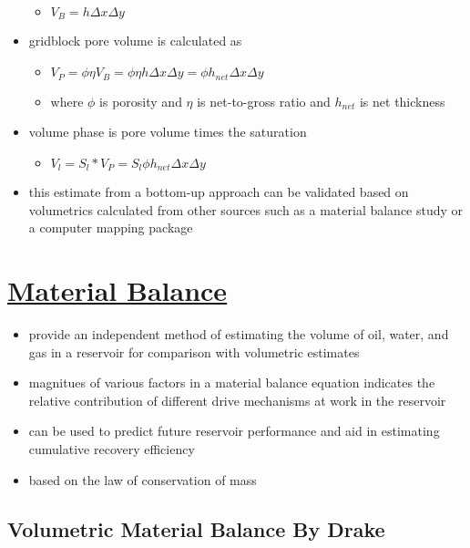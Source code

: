 \documentclass[11pt]{article}
\begin{document}
\begin{itemize}
\begin{itemize}
\item \(V_B = h \Delta x \Delta y\)
\end{itemize}
\item gridblock pore volume is calculated as
\begin{itemize}
\item \(V_P = \phi \eta V_B = \phi \eta h \Delta x \Delta y = \phi h_{net} \Delta x \Delta y\)
\item where \(\phi\) is porosity and \(\eta\) is net-to-gross ratio and \(h_{net}\) is net thickness
\end{itemize}
\item volume phase is pore volume times the saturation
\begin{itemize}
\item \(V_l = S_l * V_P = S_l \phi h_{net} \Delta x \Delta y\)
\end{itemize}
\item this estimate from a bottom-up approach can be validated based on volumetrics calculated from other sources such as a material balance study or a computer mapping package
\end{itemize}
\section{\href{materialbalance.org}{Material Balance}}
\label{sec:org8b6b8c1}
\begin{itemize}
\item provide an independent method of estimating the volume of oil, water, and gas in a reservoir for comparison with volumetric estimates
\item magnitues of various factors in a material balance equation indicates the relative contribution of different drive mechanisms at work in the reservoir
\item can be used to predict future reservoir performance and aid in estimating cumulative recovery efficiency
\item based on the law of conservation of mass
\end{itemize}
\subsection{Volumetric Material Balance By Drake}
\label{sec:org62b63de}
\end{document}

